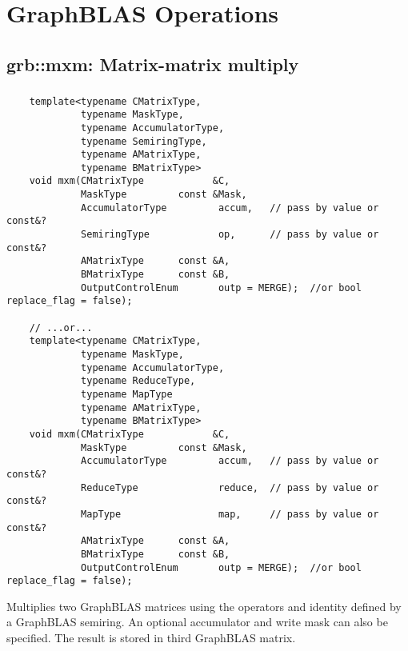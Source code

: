 \chapter{GraphBLAS Operations}
\label{Ch:Operations}

\section{{\sf grb::mxm}: Matrix-matrix multiply}

\paragraph{\syntax}

\begin{verbatim}
    template<typename CMatrixType,
             typename MaskType,
             typename AccumulatorType,
             typename SemiringType,
             typename AMatrixType,
             typename BMatrixType>
    void mxm(CMatrixType            &C,
             MaskType         const &Mask,
             AccumulatorType         accum,   // pass by value or const&?
             SemiringType            op,      // pass by value or const&?
             AMatrixType      const &A,
             BMatrixType      const &B,
             OutputControlEnum       outp = MERGE);  //or bool replace_flag = false);

    // ...or...
    template<typename CMatrixType,
             typename MaskType,
             typename AccumulatorType,
             typename ReduceType,
             typename MapType
             typename AMatrixType,
             typename BMatrixType>
    void mxm(CMatrixType            &C,
             MaskType         const &Mask,
             AccumulatorType         accum,   // pass by value or const&?
             ReduceType              reduce,  // pass by value or const&?
             MapType                 map,     // pass by value or const&?
             AMatrixType      const &A,
             BMatrixType      const &B,
             OutputControlEnum       outp = MERGE);  //or bool replace_flag = false);
\end{verbatim}

Multiplies two GraphBLAS matrices using the operators and identity defined by a GraphBLAS semiring. An optional accumulator and write mask can also be specified. The result is stored in third GraphBLAS matrix.

